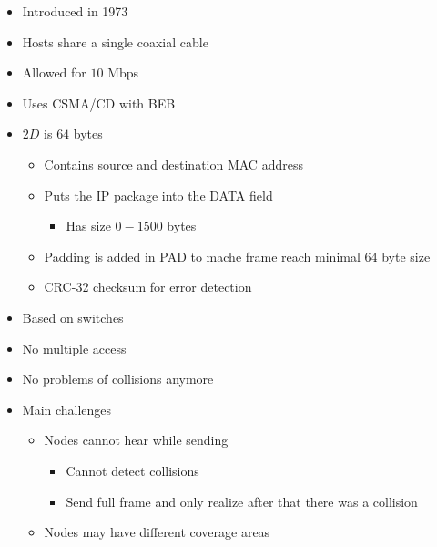 \begin{itemize}
        \begin{itemize}
            \item Introduced in 1973
            \item Hosts share a single coaxial cable
            \item Allowed for $10$ Mbps
            \item Uses CSMA/CD with BEB
            \item $2D$ is $64$ bytes
                \begin{itemize}
                    \item Contains source and destination MAC address
                    \item Puts the IP package into the DATA field
                        \begin{itemize}
                            \item Has size $0 - 1500$ bytes
                        \end{itemize}
                    \item Padding is added in PAD to mache frame reach minimal $64$ byte size
                    \item CRC-32 checksum for error detection
                \end{itemize}
        \end{itemize}
        \begin{itemize}
            \item Based on switches
            \item No multiple access
            \item No problems of collisions anymore
        \end{itemize}
        \begin{itemize}
            \item Main challenges
                \begin{itemize}
                    \item Nodes cannot hear while sending
                        \begin{itemize}
                            \item Cannot detect collisions
                            \item Send full frame and only realize after that there was a collision
                        \end{itemize}
                    \item Nodes may have different coverage areas

\end{itemize}
\end{itemize}
\end{itemize}

